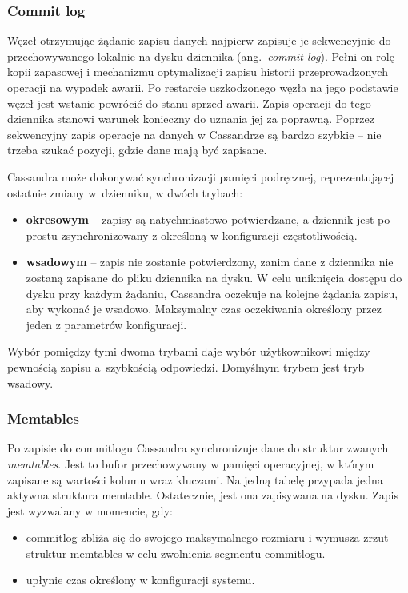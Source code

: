 \subsubsection{Commit log}

Węzeł otrzymując żądanie zapisu danych najpierw zapisuje je sekwencyjnie do przechowywanego lokalnie na dysku dziennika (ang.~\textit{commit log}).
Pełni on rolę kopii zapasowej i mechanizmu optymalizacji zapisu historii przeprowadzonych operacji na wypadek awarii.
Po restarcie uszkodzonego węzła na jego podstawie węzeł jest wstanie powrócić do stanu sprzed awarii.
Zapis operacji do tego dziennika stanowi warunek konieczny do uznania jej za poprawną.
Poprzez sekwencyjny zapis operacje na danych w Cassandrze są bardzo szybkie -- nie trzeba szukać pozycji, gdzie dane mają być zapisane.

Cassandra może dokonywać synchronizacji pamięci podręcznej, reprezentującej ostatnie zmiany w~dzienniku, w dwóch trybach:
\begin{itemize}
    \item \textbf{okresowym} -- zapisy są natychmiastowo potwierdzane, a dziennik jest po prostu zsynchronizowany z określoną w konfiguracji częstotliwością.
    \item \textbf{wsadowym} -- zapis nie zostanie potwierdzony, zanim dane z dziennika nie zostaną zapisane do pliku dziennika na dysku. 
    W celu uniknięcia dostępu do dysku przy każdym żądaniu, Cassandra oczekuje na kolejne żądania zapisu, aby wykonać je wsadowo. 
    Maksymalny czas oczekiwania określony przez jeden z parametrów konfiguracji.
\end{itemize}
Wybór pomiędzy tymi dwoma trybami daje wybór użytkownikowi między pewnością zapisu a~szybkością odpowiedzi. Domyślnym trybem jest tryb wsadowy.

\subsubsection{Memtables}

Po zapisie do commitlogu Cassandra synchronizuje dane do struktur zwanych \textit{memtables}.
Jest to bufor przechowywany w pamięci operacyjnej, w którym zapisane są wartości kolumn wraz kluczami.
Na jedną tabelę przypada jedna aktywna struktura memtable.
Ostatecznie, jest ona zapisywana na dysku.
Zapis jest wyzwalany w momencie, gdy:
\begin{itemize}
    \item commitlog zbliża się do swojego maksymalnego rozmiaru i wymusza zrzut struktur memtables w celu zwolnienia segmentu commitlogu.
    \item upłynie czas określony w konfiguracji systemu.
\end{itemize}

